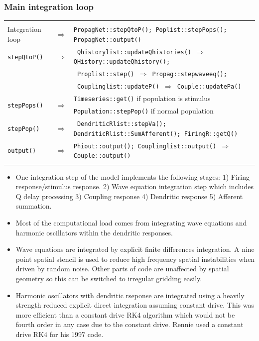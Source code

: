 \documentclass[12pt,a4paper]{article}
\newcommand{\type}[1]{ {\small\small\tt #1} }
\begin{document}
\subsubsection{Main integration loop}

\begin{center}
\begin{tabular}{ | l l p{12cm} | }
\hline \\

Integration loop& $\Rightarrow$ &\type{PropagNet::stepQtoP(); Poplist::stepPops(); PropagNet::output() }\\[6pt]

\type{stepQtoP()}& $\Rightarrow$ &
\type{ Qhistorylist::updateQhistories() $\Rightarrow$ QHistory::updateQhistory(); }\\
&&\type{ Proplist::step() $\Rightarrow$ Propag::stepwaveeq(); } \\
&&\type{ Couplinglist::updateP() $\Rightarrow$ Couple::updatePa() }\\[6pt]

\multirow{2}{*}{\type{stepPops()}}&\multirow{2}{*}{$\Rightarrow$}&
\type{Timeseries::get()} if population is stimulus \\
&& \type{Population::stepPop()} if normal population \\[6pt]

\type{stepPop()} & $\Rightarrow$ & \type{ DendriticRlist::stepVa(); DendriticRlist::SumAfferent(); FiringR::getQ() } \\[6pt]

\type{output()}&$\Rightarrow$& \type{Phiout::output(); Couplinglist::output() $\Rightarrow$ Couple::output() }\\

\\\hline
\end{tabular}
\end{center}

\begin{itemize}
\item One integration step of the model implements the following stages: 1) Firing response/\linebreak stimulus response. 2) Wave equation integration step which includes Q delay processing 3) Coupling response 4) Dendritic response 5) Afferent summation.
\item Most of the computational load comes from integrating wave equations and harmonic oscillators within the dendritic responses.
\item Wave equations are integrated by explicit finite differences integration. A nine point spatial stencil is used to reduce high frequency spatial instabilities when driven by random noise. Other parts of code are unaffected by spatial geometry so this can be switched to irregular gridding easily.
\item Harmonic oscillators with dendritic rseponse are integrated using a heavily strength reduced explicit direct integration assuming constant drive. This was more efficient than a constant drive RK4 algorithm which would not be fourth order in any case due to the constant drive. Rennie used a constant drive RK4 for his 1997 code.
\end{itemize}
\end{document}
